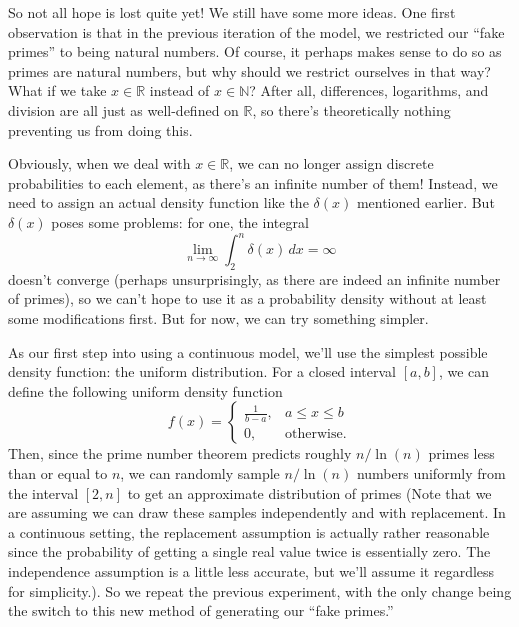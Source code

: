 \documentclass[conference]{IEEEtran}
\begin{document}
So not all hope is lost quite yet! We still have some more ideas.
One first observation is that in the previous iteration of the model,
we restricted our ``fake primes'' to being natural numbers. Of course,
it perhaps makes sense to do so as primes are natural numbers, but
why should we restrict ourselves in that way? What if we take $x \in \mathbb{R}$
instead of $x \in \mathbb{N}$? After all, differences, logarithms, and
division are all just as well-defined on $\mathbb{R}$, so there's theoretically
nothing preventing us from doing this.

Obviously, when we deal with $x \in \mathbb{R}$, we can
no longer assign discrete probabilities to each element,
as there's an infinite number of them! Instead, we need
to assign an actual density function like the $\delta(x)$
mentioned earlier. But $\delta(x)$ poses some problems:
for one, the integral
\[\lim_{n \to \infty} \int_2^n \delta(x)\, dx = \infty\]
doesn't converge (perhaps unsurprisingly, as there are
indeed an infinite number of primes), so we can't hope to
use it as a probability density without at least some
modifications first. But for now, we can try something
simpler.

As our first step into using a continuous model, we'll
use the simplest possible density function: the uniform
distribution. For a closed interval $[a, b]$, we can
define the following uniform density function
\[f(x) = \begin{cases}\frac{1}{b-a}, & a \le x \le b \\ 0, & \text{otherwise}.\end{cases}\]
Then, since the prime number theorem predicts roughly
$n/\ln(n)$ primes less than or equal to $n$, we can
randomly sample $n/\ln(n)$ numbers uniformly from the
interval $[2, n]$ to get an approximate distribution of
primes (Note that we are assuming we can draw these
samples independently and with replacement. In a
continuous setting, the replacement assumption is
actually rather reasonable since the probability
of getting a single real value twice is essentially zero.
The independence assumption is a little less accurate,
but we'll assume it regardless for simplicity.).
So we repeat the
previous experiment, with the
only change being the switch to this new method of
generating our ``fake primes.''
\end{document}
